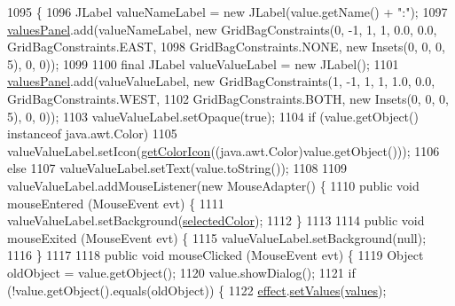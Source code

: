 \begin{DoxyCode}
1095                                                  \{
1096             JLabel valueNameLabel = \textcolor{keyword}{new} JLabel(value.getName() + \textcolor{stringliteral}{":"});
1097             \mbox{\hyperlink{classorg_1_1newdawn_1_1slick_1_1tools_1_1hiero_1_1_hiero_1_1_effect_panel_af5143573310e9ad4c1d3ff511d8967de}{valuesPanel}}.add(valueNameLabel, \textcolor{keyword}{new} GridBagConstraints(0, -1, 1, 1, 0.0, 0.0, 
      GridBagConstraints.EAST,
1098                 GridBagConstraints.NONE, \textcolor{keyword}{new} Insets(0, 0, 0, 5), 0, 0));
1099 
1100             \textcolor{keyword}{final} JLabel valueValueLabel = \textcolor{keyword}{new} JLabel();
1101             \mbox{\hyperlink{classorg_1_1newdawn_1_1slick_1_1tools_1_1hiero_1_1_hiero_1_1_effect_panel_af5143573310e9ad4c1d3ff511d8967de}{valuesPanel}}.add(valueValueLabel, \textcolor{keyword}{new} GridBagConstraints(1, -1, 1, 1, 1.0, 0.0, 
      GridBagConstraints.WEST,
1102                 GridBagConstraints.BOTH, \textcolor{keyword}{new} Insets(0, 0, 0, 5), 0, 0));
1103             valueValueLabel.setOpaque(\textcolor{keyword}{true});
1104             \textcolor{keywordflow}{if} (value.getObject() instanceof java.awt.Color)
1105                 valueValueLabel.setIcon(\mbox{\hyperlink{classorg_1_1newdawn_1_1slick_1_1tools_1_1hiero_1_1_hiero_a965ca93fb655336c8320938445d75ece}{getColorIcon}}((java.awt.Color)value.getObject()));
1106             \textcolor{keywordflow}{else}
1107                 valueValueLabel.setText(value.toString());
1108 
1109             valueValueLabel.addMouseListener(\textcolor{keyword}{new} MouseAdapter() \{
1110                 \textcolor{keyword}{public} \textcolor{keywordtype}{void} mouseEntered (MouseEvent evt) \{
1111                     valueValueLabel.setBackground(\mbox{\hyperlink{classorg_1_1newdawn_1_1slick_1_1tools_1_1hiero_1_1_hiero_1_1_effect_panel_a1027c75c43844b95f5d3341bc7bb4286}{selectedColor}});
1112                 \}
1113 
1114                 \textcolor{keyword}{public} \textcolor{keywordtype}{void} mouseExited (MouseEvent evt) \{
1115                     valueValueLabel.setBackground(null);
1116                 \}
1117 
1118                 \textcolor{keyword}{public} \textcolor{keywordtype}{void} mouseClicked (MouseEvent evt) \{
1119                     Object oldObject = value.getObject();
1120                     value.showDialog();
1121                     \textcolor{keywordflow}{if} (!value.getObject().equals(oldObject)) \{
1122                         \mbox{\hyperlink{classorg_1_1newdawn_1_1slick_1_1tools_1_1hiero_1_1_hiero_1_1_effect_panel_a57287dac230d74e637ffe17f55736869}{effect}}.\mbox{\hyperlink{interfaceorg_1_1newdawn_1_1slick_1_1font_1_1effects_1_1_configurable_effect_ac5e1cb43cb0c6b61753616dc746903a2}{setValues}}(\mbox{\hyperlink{classorg_1_1newdawn_1_1slick_1_1tools_1_1hiero_1_1_hiero_1_1_effect_panel_a9dc442992f06a08442cc7e8430615534}{values}});

\end{DoxyCode}
